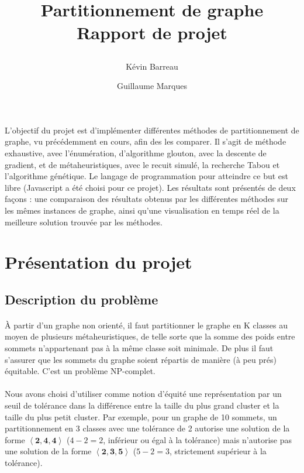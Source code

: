 \documentclass[12pt]{article}
\title{
 \begin{minipage}\linewidth
        \centering
        Partitionnement de graphe 
        \vskip3pt
        \large Rapport de projet
    \end{minipage}
 }
\author{Kévin Barreau \and Guillaume Marques}
\begin{document}
\maketitle

\abstract
L'objectif du projet est d'implémenter différentes méthodes de partitionnement de graphe, vu précédemment en cours, afin des les comparer. Il s'agit de méthode exhaustive, avec l'énumération, d'algorithme glouton, avec la descente de gradient, et de métaheuristiques, avec le recuit simulé, la recherche Tabou et l'algorithme génétique. Le langage de programmation pour atteindre ce but est libre (Javascript a été choisi pour ce projet). Les résultats sont présentés de deux façons : une comparaison des résultats obtenus par les différentes méthodes sur les mêmes instances de graphe, ainsi qu'une visualisation en temps réel de la meilleure solution trouvée par les méthodes.

\newpage

\renewcommand{\contentsname}{Sommaire} 
\tableofcontents

\newpage

\section{Présentation du projet}

\subsection{Description du problème}

\paragraph{}À partir d'un graphe non orienté, il faut partitionner le graphe en K classes au moyen de plusieurs métaheuristiques, de telle sorte que la somme des poids entre sommets n'appartenant pas à la même classe soit minimale. De plus il faut s'assurer que les sommets du graphe soient répartis de manière (à
peu prés) équitable. C'est un problème NP-complet.
\paragraph{}Nous avons choisi d'utiliser comme notion d'équité une représentation par un seuil de tolérance dans la différence entre la taille du plus grand cluster et la taille du plus petit cluster. Par exemple, pour un graphe de 10 sommets, un partitionnement en 3 classes avec une tolérance de 2 autorise une solution de la forme $\mathbf{\left\langle 2,4,4 \right\rangle}$ ($4-2 = 2$, inférieur ou égal à la tolérance) mais n'autorise pas une solution de la forme $\mathbf{\left\langle 2,3,5 \right\rangle}$ ($5-2 = 3$, strictement supérieur à la tolérance).
\end{document}
